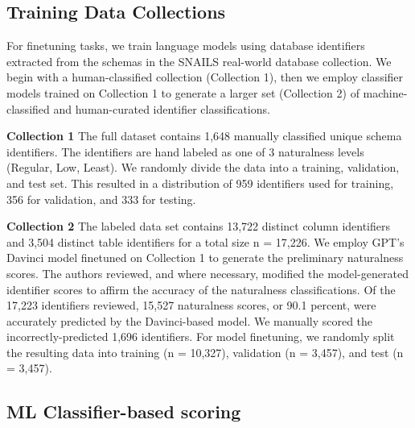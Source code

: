 \subsection{Training Data Collections}

For finetuning tasks, we train language models using database identifiers extracted from the schemas in the SNAILS real-world database collection.
We begin with a human-classified collection (Collection 1), then we employ classifier models trained on Collection 1 to generate a larger set (Collection 2) of machine-classified and human-curated identifier classifications.

\textbf{Collection 1} The full dataset contains 1,648 manually classified unique schema identifiers. The identifiers are hand labeled as one of 3 naturalness levels (Regular, Low, Least). We randomly divide the data into a training, validation, and test set. This resulted in a distribution of 959 identifiers used for training, 356 for validation, and 333 for testing. 

\textbf{Collection 2} The labeled data set contains 13,722 distinct column identifiers and 3,504 distinct table identifiers for a total size n = 17,226. 
We employ GPT's Davinci model finetuned on Collection 1 to generate the preliminary naturalness scores.
The authors reviewed, and where necessary, modified the model-generated identifier scores to affirm the accuracy of the naturalness classifications.
Of the 17,223 identifiers reviewed, 15,527 naturalness scores, or 90.1 percent, were accurately predicted by the Davinci-based model.
We manually scored the incorrectly-predicted 1,696 identifiers.
For model finetuning, we randomly split the resulting data into training (n = 10,327), validation (n = 3,457), and test (n = 3,457).

\subsection{ML Classifier-based scoring}

